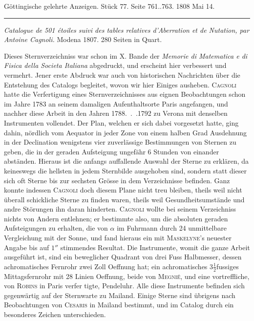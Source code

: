\clearpage
{}
\hypertarget{native-501-lower}{}\label{native-501-lower}
\begin{center}
\small Göttingische gelehrte Anzeigen. Stück 77. Seite 761..763. 1808 Mai 14.\\[3pt]
\rule{.72\linewidth}{.3pt}
\end{center}

\emph{Catalogue de \textup{501} étoiles suivi des tables relatives d'Aberration et de Nutation, par Antoine Cagnoli.} Modena 1807. 280 Seiten in Quart.

Dieses Sternverzeichniss war schon im X. Bande der \emph{Memorie di Matematica e di Fisica della Societa Italiana} abgedruckt, und erscheint hier verbessert und vermehrt. Jener erste Abdruck war auch von historischen Nachrichten über die Entstehung des Catalogs begleitet, wovon wir hier Einiges ausheben. \textsc{Cagnoli} hatte die Verfertigung eines Sternverzeichnisses aus eignen Beobachtungen schon im Jahre 1783 an seinem damaligen Aufenthaltsorte Paris angefangen, und nachher diese Arbeit in den Jahren 1788\mbox{. . .}1792 zu Verona mit denselben Instrumenten vollendet. Der Plan, welchen er sich dabei vorgesetzt hatte, ging dahin, nördlich vom Aequator in jeder Zone von einem halben Grad Ausdehnung in der Declination wenigstens vier zuverlässige Bestimmungen von Sternen zu geben, die in der geraden Aufsteigung ungefähr 6 Stunden von einander abständen. Hieraus ist die anfangs auffallende Auswahl der Sterne zu erklären, da keineswegs die hellsten in jedem Sternbilde ausgehoben sind, sondern statt dieser sich oft Sterne bis zur sechsten Grösse in dem Verzeichnisse befinden. Ganz konnte indessen \textsc{Cagnoli} doch diesem Plane nicht treu bleiben, theils weil nicht überall schickliche Sterne zu finden waren, theils weil Gesundheitsumstände und andre Störungen ihn daran hinderten. \textsc{Cagnoli} wollte bei seinem Verzeichniss nichts von Andern entlehnen; er bestimmte also, um die absoluten geraden Aufsteigungen zu erhalten, die von $\alpha$ im Fuhrmann durch 24 unmittelbare Vergleichung mit der Sonne, und fand hieraus ein mit \textsc{Maskelyne}'s neuester Angabe bis auf $1''$ stimmendes Resultat. Die Instrumente, womit die ganze Arbeit ausgeführt ist, sind ein beweglicher Quadrant von drei Fuss Halbmesser, dessen achromatisches Fernrohr zwei Zoll Oeffnung hat; ein achromatisches 3$\frac{1}{2}$fussiges Mittagsfernrohr mit 28 Linien Oeffnung, beide von \textsc{Megnié}, und eine vortreffliche, von \textsc{Robins} in Paris verfer%
%
tigte, Pendeluhr. Alle diese Instrumente befinden sich gegenwärtig auf der Sternwarte zu Mailand. Einige Sterne sind übrigens nach Beobachtungen von \textsc{Cesaris} in Mailand bestimmt, und im Catalog durch ein besonderes Zeichen unterschieden.

